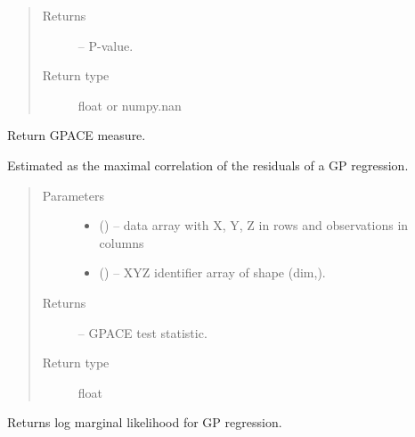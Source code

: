 \documentclass[letterpaper,10pt,english]{sphinxmanual}
\begin{document}
\begin{fulllineitems}
\begin{fulllineitems}
\begin{quote}
\begin{description}
\item[{Returns}] \leavevmode
{} -- P-value.

\item[{Return type}] \leavevmode
float or numpy.nan

\end{description}\end{quote}

\end{fulllineitems}


\begin{fulllineitems}
\label{\detokenize{index:tigramite.independence_tests.GPACE.get_dependence_measure}}
Return GPACE measure.

Estimated as the maximal correlation of the residuals of a GP
regression.
\begin{quote}\begin{description}
\item[{Parameters}] \leavevmode\begin{itemize}
\item {} 
 () -- data array with X, Y, Z in rows and observations in columns

\item {} 
 () -- XYZ identifier array of shape (dim,).

\end{itemize}

\item[{Returns}] \leavevmode
{} -- GPACE test statistic.

\item[{Return type}] \leavevmode
float

\end{description}\end{quote}

\end{fulllineitems}


\begin{fulllineitems}
\label{\detokenize{index:tigramite.independence_tests.GPACE.get_model_selection_criterion}}
Returns log marginal likelihood for GP regression.


\end{fulllineitems}
\end{fulllineitems}
\end{document}
